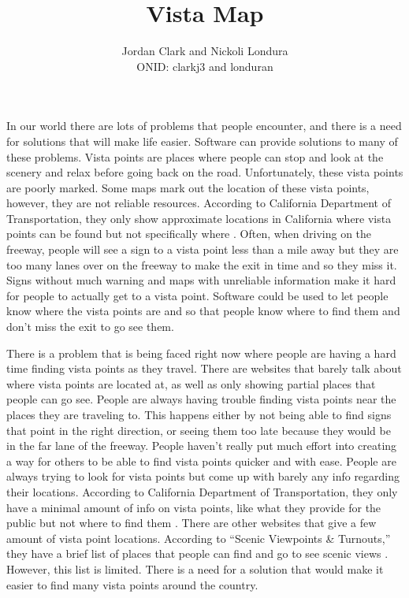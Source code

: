 \documentclass[12pt]{article}
\title{Vista Map}
\author{Jordan Clark and Nickoli Londura \\
       ONID: clarkj3 and londuran    }
\begin{document}
\maketitle

In our world there are lots of problems that people encounter, and there is a need for solutions that will make life easier. Software can provide solutions to many of these problems. Vista points are places where people can stop and look at the scenery and relax before going back on the road. Unfortunately, these vista points are poorly marked. Some maps mark out the location of these vista points, however, they are not reliable resources. According to California Department of Transportation, they only show approximate locations in California where vista points can be found but not specifically where \cite{california_department_of_transportation_2015}. Often, when driving on the freeway, people will see a sign to a vista point less than a mile away but they are too many lanes over on the freeway to make the exit in time and so they miss it. Signs without much warning and maps with unreliable information make it hard for people to actually get to a vista point. Software could be used to let people know where the vista points are and so that people know where to find them and don’t miss the exit to go see them.

There is a problem that is being faced right now where people are having a hard time finding vista points as they travel. There are websites that barely talk about where vista points are located at, as well as only showing partial places that people can go see. People are always having trouble finding vista points near the places they are traveling to. This happens either by not being able to find signs that point in the right direction, or seeing them too late because they would be in the far lane of the freeway. People haven’t really put much effort into creating a way for others to be able to find vista points quicker and with ease. People are always trying to look for vista points but come up with barely any info regarding their locations. According to California Department of Transportation, they only have a minimal amount of info on vista points, like what they provide for the public but not where to find them \cite{california_department_of_transportation_2018}. There are other websites that give a few amount of vista point locations. According to “Scenic Viewpoints \& Turnouts,” they have a brief list of places that people can find and go to see scenic views \cite{scenic_viewpoints}. However, this list is limited. There is a need for a solution that would make it easier to find many vista points around the country.
\end{document}
